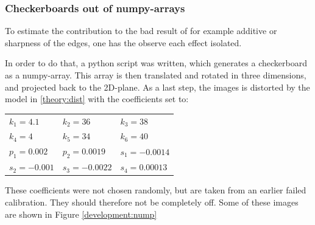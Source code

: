 \subsubsection{Checkerboards out of numpy-arrays}  
To estimate the contribution to the bad result of for example additive or sharpness of the edges, one has the observe each effect isolated.

In order to do that, a python script was written, which generates a checkerboard as a numpy-array.
This array is then translated and rotated in three dimensions, and projected back to the 2D-plane.
As a last step, the images is distorted by the model in \ref{theory:dist} with the coefficients set to:
\begin{center}
	\begin{tabular}{lll}
		$k_1 = 4.1$   &$k_2 = 36$     &$k_3 = 38$\\
		$k_4 = 4$     &$k_5 = 34$     &$k_6 = 40$\\
		$p_1 = 0.002$ &$p_2 = 0.0019$ &$s_1 = -0.0014$\\
		$s_2 = -0.001$&$s_3 = -0.0022$&$s_4 = 0.00013$	
	\end{tabular} 
\end{center}
These coefficients were not chosen randomly, but are taken from an earlier failed calibration.
They should therefore not be completely off.
Some of these images are shown in Figure \ref{development:nump}

